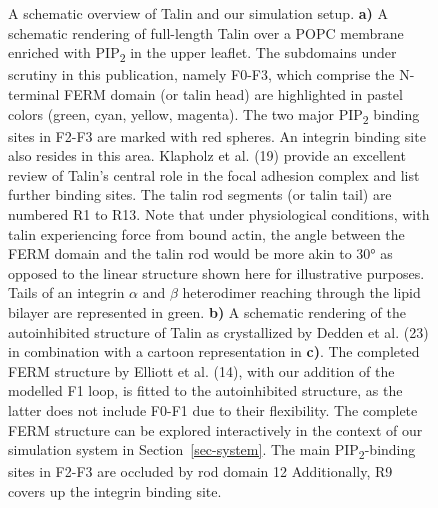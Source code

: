 \documentclass[
  twocolumn]{biophys-new-mod}
\begin{document}
\begin{figure}
\begin{minipage}[t]{0.50\linewidth}
{\centering 


}

\subcaption{\label{fig-tln-align-autoinhib}~}
\end{minipage}%

\caption{\label{fig-structure}A schematic overview of Talin and our
simulation setup. \textbf{a)} A schematic rendering of full-length Talin
over a POPC membrane enriched with PIP\textsubscript{2} in the upper
leaflet. The subdomains under scrutiny in this publication, namely
F0-F3, which comprise the N-terminal FERM domain (or talin head) are
highlighted in pastel colors (green, cyan, yellow, magenta). The two
major PIP\textsubscript{2} binding sites in F2-F3 are marked with red
spheres. An integrin binding site also resides in this area. Klapholz et
al. (19) provide an excellent review of Talin's central role in the
focal adhesion complex and list further binding sites. The talin rod
segments (or talin tail) are numbered R1 to R13. Note that under
physiological conditions, with talin experiencing force from bound
actin, the angle between the FERM domain and the talin rod would be more
akin to 30° as opposed to the linear structure shown here for
illustrative purposes. Tails of an integrin \(\alpha\) and \(\beta\)
heterodimer reaching through the lipid bilayer are represented in green.
\textbf{b)} A schematic rendering of the autoinhibited structure of
Talin as crystallized by Dedden et al. (23) in combination with a
cartoon representation in \textbf{c)}. The completed FERM structure by
Elliott et al. (14), with our addition of the modelled F1 loop, is
fitted to the autoinhibited structure, as the latter does not include
F0-F1 due to their flexibility. The complete FERM structure can be
explored interactively in the context of our simulation system in
Section~\ref{sec-system}. The main PIP\textsubscript{2}-binding sites in
F2-F3 are occluded by rod domain 12 Additionally, R9 covers up the
integrin binding site.}

\end{figure}
\end{document}
